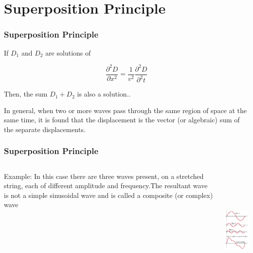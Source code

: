 \documentclass[]{beamer}
\begin{document}

\section{Superposition Principle}

\begin{frame}
\frametitle{Superposition Principle}

If $D_1$ and $D_2$ are solutions of 

\begin{equation*}
\frac{\partial^2D}{\partial x^2}=\frac{1}{v^2} \frac{\partial^2D}{\partial^2 t}
\end{equation*}

Then, the sum $D_1+D_2$ is also a solution..
\vspace{3mm}

\pause

In general, when two or more waves pass through the same region of space at the same time,
it is found that the displacement is the vector (or algebraic)
sum of the separate displacements.


  \end{frame}







\begin{frame}
\frametitle{Superposition Principle}



   \begin{columns}[c]
   \column{2in}  %
  
Example:  In this case
there are three waves present, on a stretched string, each of different amplitude
and frequency.The resultant wave is not a simple sinusoidal wave and is called a composite
(or complex) wave

   \column{2in}


  \begin{center}
  \includegraphics[height=2.5in]{images4/11.jpg}
\end{center}


   \end{columns}




  \end{frame}
\end{document}
